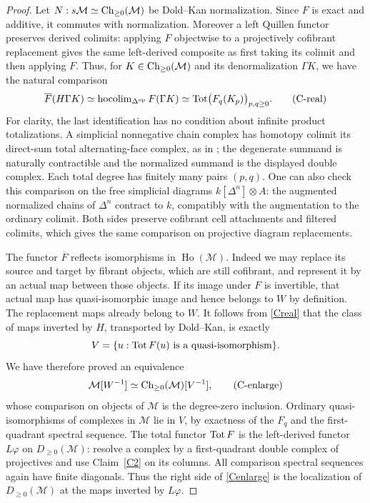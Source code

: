 \begin{proof}
Let $N:s\mathcal M\simeq\operatorname{Ch}_{\geq0}(\mathcal M)$ be Dold--Kan normalization. Since $F$ is exact and additive, it commutes with normalization. Moreover a left Quillen functor preserves derived colimits: applying $F$ objectwise to a projectively cofibrant replacement gives the same left-derived composite as first taking its colimit and then applying $F$. Thus, for $K\in\operatorname{Ch}_{\geq0}(\mathcal M)$ and its denormalization $\Gamma K$, we have the natural comparison
\[
 \overline F(H\Gamma K)\simeq
 \operatorname{hocolim}_{\Delta^{\mathrm{op}}}F(\Gamma K)
 \simeq \operatorname{Tot}\bigl(F_q(K_p)\bigr)_{p,q\geq0}. \tag{C-real}\label{Creal}
\]
For clarity, the last identification has no condition about infinite product totalizations. A simplicial nonnegative chain complex has homotopy colimit its direct-sum total alternating-face complex, as in \citet[Proposition 19.9]{DuggerHocolim}; the degenerate summand is naturally contractible and the normalized summand is the displayed double complex. Each total degree has finitely many pairs $(p,q)$. One can also check this comparison on the free simplicial diagrams $k[\Delta^n]\otimes A$: the augmented normalized chains of $\Delta^n$ contract to $k$, compatibly with the augmentation to the ordinary colimit. Both sides preserve cofibrant cell attachments and filtered colimits, which gives the same comparison on projective diagram replacements.

The functor $\overline F$ reflects isomorphisms in $\operatorname{Ho}(\mathcal M)$. Indeed we may replace its source and target by fibrant objects, which are still cofibrant, and represent it by an actual map between those objects. If its image under $F$ is invertible, that actual map has quasi-isomorphic image and hence belongs to $W$ by definition. The replacement maps already belong to $W$. It follows from \eqref{Creal} that the class of maps inverted by $H$, transported by Dold--Kan, is exactly
\[
 V=\{u:\operatorname{Tot} F(u)\text{ is a quasi-isomorphism}\}.
\]
We have therefore proved an equivalence
\[
 \mathcal M[W^{-1}]\simeq\operatorname{Ch}_{\geq0}(\mathcal M)[V^{-1}], \tag{C-enlarge}\label{Cenlarge}
\]
whose comparison on objects of $\mathcal M$ is the degree-zero inclusion. Ordinary quasi-isomorphisms of complexes in $\mathcal M$ lie in $V$, by exactness of the $F_q$ and the first-quadrant spectral sequence. The total functor $\operatorname{Tot} F$ is the left-derived functor $L\varphi$ on $D_{\geq0}(\mathcal M)$: resolve a complex by a first-quadrant double complex of projectives and use Claim~\ref{C2} on its columns. All comparison spectral sequences again have finite diagonals. Thus the right side of \eqref{Cenlarge} is the localization of $D_{\geq0}(\mathcal M)$ at the maps inverted by $L\varphi$.


\end{proof}
